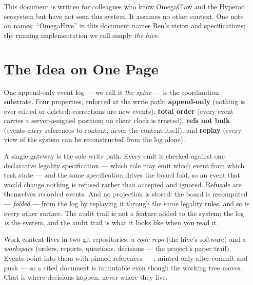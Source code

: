 This document is written for colleagues who know OmegaClaw and the Hyperon ecosystem but have not seen this system. It assumes no other context. One note on names: ``OmegaHive'' in this document names Ben's vision and specifications; the running implementation we call simply \emph{the hive}.

\section{The Idea on One Page}

One append-only event log --- we call it \emph{the spine} --- is the coordination substrate. Four properties, enforced at the write path: \textbf{append-only} (nothing is ever edited or deleted; corrections are new events), \textbf{total order} (every event carries a server-assigned position; no client clock is trusted), \textbf{refs not bulk} (events carry references to content, never the content itself), and \textbf{replay} (every view of the system can be reconstructed from the log alone).

A single gateway is the sole write path. Every emit is checked against one declarative legality specification --- which role may emit which event from which task state --- and the same specification drives the board fold, so an event that would change nothing is refused rather than accepted and ignored. Refusals are themselves recorded events. And no projection is stored: the board is recomputed --- \emph{folded} --- from the log by replaying it through the same legality rules, and so is every other surface. The audit trail is not a feature added to the system; the log \emph{is} the system, and the audit trail is what it looks like when you read it.

Work content lives in two git repositories: a \emph{code repo} (the hive's software) and a \emph{workspace} (orders, reports, questions, decisions --- the project's paper trail). Events point into them with pinned references --- , minted only after commit and push --- so a cited document is immutable even though the working tree moves. Chat is where decisions happen, never where they live.

